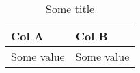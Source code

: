 \begin{table}[h]
\centering
\footnotesize
\caption{Some title}
\label{tbl_generic}

\begin{tabular}{@{}ll@{}}
Col A      & Col B      \\ 
\midrule
Some value & Some value
\end{tabular}

\end{table}